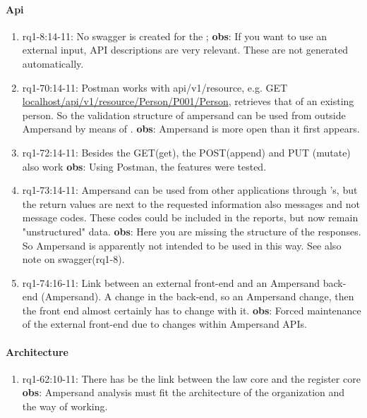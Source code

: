 \paragraph{Api}
\begin{enumerate}
    \item rq1-8:14-11: No swagger is created for the ;
    \newline\textbf{obs}: If you want to use an external input, API descriptions are very relevant.
    These are not generated automatically.
    
    \item rq1-70:14-11: Postman works with api/v1/resource, e.g. GET \url{localhost/api/v1/resource/Person/P001/Person}, retrieves that of an existing person.
    So the validation structure of ampersand can be used from outside Ampersand by means of .
    \newline\textbf{obs}: Ampersand is more open than it first appears.

    \item rq1-72:14-11: Besides the GET(get), the POST(append) and PUT (mutate) also work
    \newline\textbf{obs}: Using Postman, the  features were tested.
    
    \item rq1-73:14-11: Ampersand can be used from other applications through 's, but the return values are next to the requested information also messages and not message codes.
    These codes could be included in the reports, but now remain "unstructured" data.
    \newline\textbf{obs}: Here you are missing the structure of the responses.
    So Ampersand is apparently not intended to be used in this way.
    See also note on swagger(rq1-8).
    
    \item rq1-74:16-11: Link between an external front-end and an Ampersand back-end (Ampersand\-).
    A change in the back-end, so an Ampersand change, then the front end almost certainly has to change with it.
    \newline\textbf{obs}: Forced maintenance of the external front-end due to changes within Ampersand APIs.

\end{enumerate}

\paragraph{Architecture}
\begin{enumerate}
    \item rq1-62:10-11: There has be the  link between the {law core} and the {register core}
    \newline\textbf{obs}: Ampersand analysis must fit the architecture of the organization and the way of working.

\end{enumerate}

